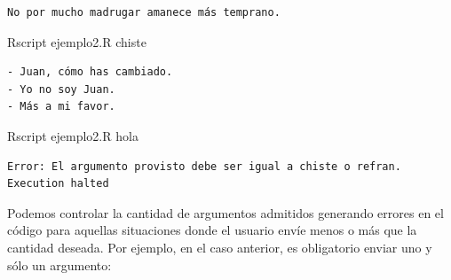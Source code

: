 \documentclass[
]{book}
\newenvironment{Shaded}{\begin{snugshade}}{\end{snugshade}}
\newcommand{\ExtensionTok}[1]{#1}
\newcommand{\NormalTok}[1]{#1}
\begin{document}
\begin{verbatim}
No por mucho madrugar amanece más temprano.
\end{verbatim}

\begin{Shaded}
\begin{Highlighting}[]
\ExtensionTok{Rscript}\NormalTok{ ejemplo2.R chiste}
\end{Highlighting}
\end{Shaded}

\begin{verbatim}
- Juan, cómo has cambiado.
- Yo no soy Juan.
- Más a mi favor.
\end{verbatim}

\begin{Shaded}
\begin{Highlighting}[]
\ExtensionTok{Rscript}\NormalTok{ ejemplo2.R hola}
\end{Highlighting}
\end{Shaded}

\begin{verbatim}
Error: El argumento provisto debe ser igual a chiste o refran.
Execution halted
\end{verbatim}

Podemos controlar la cantidad de argumentos admitidos generando errores en el código para aquellas situaciones donde el usuario envíe menos o más que la cantidad deseada. Por ejemplo, en el caso anterior, es obligatorio enviar uno y sólo un argumento:
\end{document}
